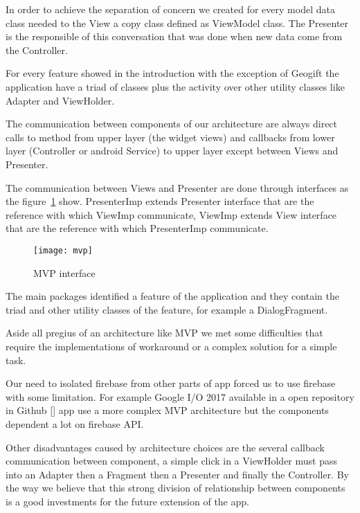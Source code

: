 In order to achieve the separation of concern we created for every model data class needed to the View a copy class defined as ViewModel class. The Presenter is the responsible of this conversation that was done when new data come from the Controller. 

For every feature showed in the introduction with the exception of Geogift the application have a triad of classes plus the activity over other utility classes like Adapter and ViewHolder. 

The communication between components of our architecture are always direct calls to method from upper layer (the widget views) and callbacks from lower layer (Controller or android Service) to upper layer except between Views and Presenter.

The communication between Views and Presenter are done through interfaces as the figure~\ref{fig:MVP_image} show. PresenterImp extends Presenter interface that are the reference with which ViewImp communicate, ViewImp extends View interface that are the reference with which PresenterImp communicate.

\begin{figure}[h]
	\texttt{[image: mvp]}
	\caption{MVP interface}
	\label{fig:MVP_image}
\end{figure}

The main packages identified a feature of the application and they contain the triad and other utility classes of the feature, for example a DialogFragment.

Aside all pregius of an architecture like MVP we met some difficulties that require the implementations of workaround or a complex solution for a simple task. 

Our need to isolated firebase from other parts of app forced us to use firebase with some limitation. For example Google I/O 2017 available in a open repository in Github [] app use a more complex MVP architecture but the components dependent a lot on firebase API.

Other disadvantages caused by architecture choices are the several callback communication between component, a simple click in a ViewHolder must pass into an Adapter then a Fragment then a Presenter and finally the Controller. By the way we believe that this strong division of relationship between components is a good investments for the future extension of the app.

